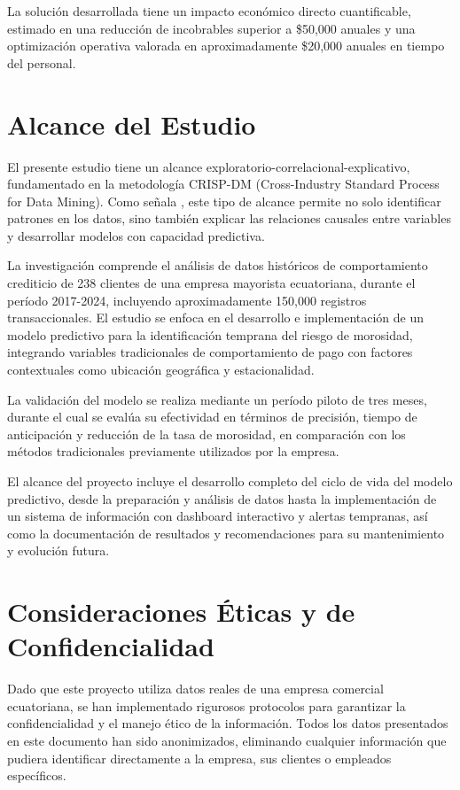 La solución desarrollada tiene un impacto económico directo cuantificable, estimado en una reducción de incobrables superior a \$50,000 anuales y una optimización operativa valorada en aproximadamente \$20,000 anuales en tiempo del personal.

\section{Alcance del Estudio}

El presente estudio tiene un alcance exploratorio-correlacional-explicativo, fundamentado en la metodología CRISP-DM (Cross-Industry Standard Process for Data Mining). Como señala \cite{hernandez2020metodologia}, este tipo de alcance permite no solo identificar patrones en los datos, sino también explicar las relaciones causales entre variables y desarrollar modelos con capacidad predictiva.

La investigación comprende el análisis de datos históricos de comportamiento crediticio de 238 clientes de una empresa mayorista ecuatoriana, durante el período 2017-2024, incluyendo aproximadamente 150,000 registros transaccionales. El estudio se enfoca en el desarrollo e implementación de un modelo predictivo para la identificación temprana del riesgo de morosidad, integrando variables tradicionales de comportamiento de pago con factores contextuales como ubicación geográfica y estacionalidad.

La validación del modelo se realiza mediante un período piloto de tres meses, durante el cual se evalúa su efectividad en términos de precisión, tiempo de anticipación y reducción de la tasa de morosidad, en comparación con los métodos tradicionales previamente utilizados por la empresa.

El alcance del proyecto incluye el desarrollo completo del ciclo de vida del modelo predictivo, desde la preparación y análisis de datos hasta la implementación de un sistema de información con dashboard interactivo y alertas tempranas, así como la documentación de resultados y recomendaciones para su mantenimiento y evolución futura.

\section{Consideraciones Éticas y de Confidencialidad}

Dado que este proyecto utiliza datos reales de una empresa comercial ecuatoriana, se han implementado rigurosos protocolos para garantizar la confidencialidad y el manejo ético de la información. Todos los datos presentados en este documento han sido anonimizados, eliminando cualquier información que pudiera identificar directamente a la empresa, sus clientes o empleados específicos.

